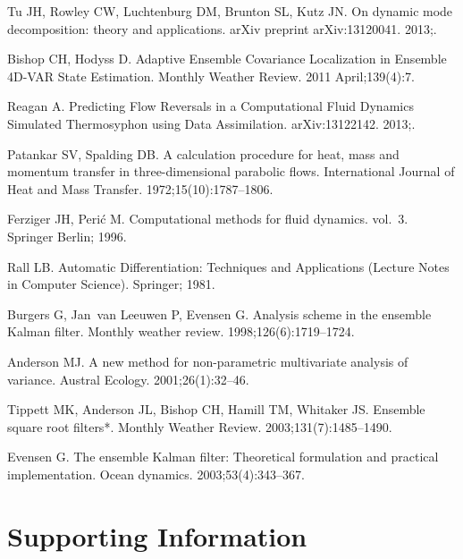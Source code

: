 \documentclass[10pt,letterpaper]{article}
\begin{document}
\begin{thebibliography}{10}
Tu JH, Rowley CW, Luchtenburg DM, Brunton SL, Kutz JN.
\newblock On dynamic mode decomposition: theory and applications.
\newblock arXiv preprint arXiv:13120041. 2013;.

Bishop CH, Hodyss D.
\newblock Adaptive Ensemble Covariance Localization in Ensemble 4D-VAR State
  Estimation.
\newblock Monthly Weather Review. 2011 April;139(4):7.

Reagan A.
\newblock Predicting Flow Reversals in a Computational Fluid Dynamics Simulated
  Thermosyphon using Data Assimilation.
\newblock arXiv:13122142. 2013;.

Patankar SV, Spalding DB.
\newblock A calculation procedure for heat, mass and momentum transfer in
  three-dimensional parabolic flows.
\newblock International Journal of Heat and Mass Transfer.
  1972;15(10):1787--1806.

Ferziger JH, Peri{\'c} M.
\newblock Computational methods for fluid dynamics. vol.~3.
\newblock Springer Berlin; 1996.

Rall LB.
\newblock Automatic Differentiation: Techniques and Applications (Lecture Notes
  in Computer Science).
\newblock Springer; 1981.

Burgers G, Jan~van Leeuwen P, Evensen G.
\newblock Analysis scheme in the ensemble Kalman filter.
\newblock Monthly weather review. 1998;126(6):1719--1724.

Anderson MJ.
\newblock A new method for non-parametric multivariate analysis of variance.
\newblock Austral Ecology. 2001;26(1):32--46.

Tippett MK, Anderson JL, Bishop CH, Hamill TM, Whitaker JS.
\newblock Ensemble square root filters*.
\newblock Monthly Weather Review. 2003;131(7):1485--1490.

Evensen G.
\newblock The ensemble Kalman filter: Theoretical formulation and practical
  implementation.
\newblock Ocean dynamics. 2003;53(4):343--367.

\end{thebibliography}




\clearpage
\pagebreak

\section*{Supporting Information}
\end{document}
